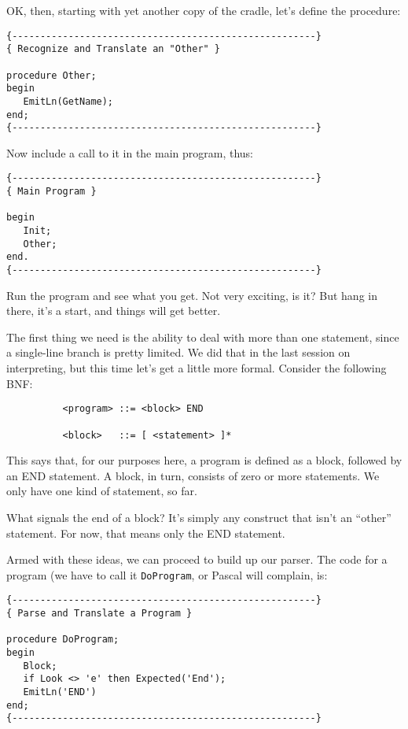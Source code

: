 OK, then, starting with  yet  another  copy  of the cradle, let's define the procedure:

\begin{verbatim}
{------------------------------------------------------}
{ Recognize and Translate an "Other" }

procedure Other;
begin
   EmitLn(GetName);
end;
{------------------------------------------------------}
\end{verbatim}

Now include a call to it in the main program, thus:

\begin{verbatim}
{------------------------------------------------------}
{ Main Program }

begin
   Init;
   Other;
end.
{------------------------------------------------------}
\end{verbatim}

Run  the program and see what you get. Not very exciting, is it?  But hang in there, it's a start, and things will get better.

The first thing we need is the ability to deal with more than one statement, since a single-line branch  is pretty limited. We did that in the last session on interpreting, but this time let's get a little more formal. Consider the following BNF:

\begin{verbatim}
          <program> ::= <block> END

          <block>   ::= [ <statement> ]*
\end{verbatim}

This says that, for our purposes here, a program is defined  as a block, followed by an END statement. A block, in  turn, consists of zero or more statements. We only have one kind  of statement, so far.

What signals the end of a block?  It's  simply any construct that isn't an ``other''  statement. For  now, that means only the END statement.

Armed with these ideas, we can proceed to build  up  our  parser. The code for a program (we  have  to call it {\tt DoProgram}, or Pascal will complain, is:

\begin{verbatim}
{------------------------------------------------------}
{ Parse and Translate a Program }

procedure DoProgram;
begin
   Block;
   if Look <> 'e' then Expected('End');
   EmitLn('END')
end;
{------------------------------------------------------}
\end{verbatim}


